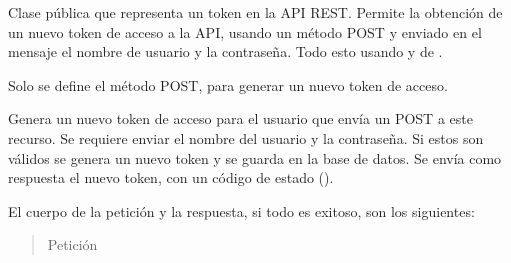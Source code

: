 \begin{fulllineitems}
\begin{fulllineitems}
\begin{fulllineitems}
\begin{sphinxVerbatim}[commandchars=\\\{\}]
    
    
\end{sphinxVerbatim}

\end{fulllineitems}


\end{fulllineitems}

\label{\detokenize{chapter_two/desc_cloudnao:module-app.resources.token}}\label{\detokenize{chapter_two/desc_cloudnao:module-token}}

\begin{fulllineitems}
\label{\detokenize{chapter_two/desc_cloudnao:app.resources.token.Token}}
Clase pública que representa un token en la API REST. Permite la obtención
de un nuevo token de acceso a la API, usando un método POST y enviado en el
mensaje el nombre de usuario y la contraseña. Todo
esto usando  y  de .

Solo se define el método POST, para generar un nuevo token de acceso.

\begin{fulllineitems}
\label{\detokenize{chapter_two/desc_cloudnao:app.resources.token.Token.post}}
Genera un nuevo token de acceso para el usuario que envía un POST
a este recurso. Se requiere enviar el nombre del usuario y la contraseña.
Si estos son válidos se genera un nuevo token y se guarda en la base
de datos. Se envía como respuesta el nuevo token, con un código de
estado  ().

El cuerpo de la petición y la respuesta, si todo es exitoso, son los
siguientes:
\begin{quote}\begin{description}
\item[{Petición}] \leavevmode
\end{description}\end{quote}


\end{fulllineitems}
\end{fulllineitems}
\end{fulllineitems}

